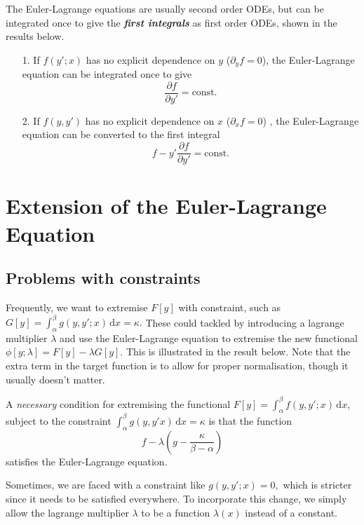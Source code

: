 \documentclass{article}
\theoremstyle{nonumberplain}
\begin{document}
The Euler-Lagrange equations are usually second order ODEs, but can be integrated once to give the \textit{\textbf{first integrals}} as first order ODEs, shown in the results below. 
\begin{frm-res} \label{res:first-integral}
    \quad 
    \begin{itemize}
        \item[1.] If $f(y' ; x)$ has no explicit dependence on $y$ ($\partial_y f =0$), the Euler-Lagrange equation can be integrated once to give 
        \[
            \frac{\partial f}{\partial y' } = \text{const}.
        \] 
        \item[2.] If $f(y,y' )$ has no explicit dependence on $x$ ($\partial_x f =0$) , the Euler-Lagrange equation can be converted to the first integral 
        \[
            f - y' \frac{\partial f}{\partial y' } = \text{const}.
        \]
    \end{itemize}
\end{frm-res}

\section{Extension of the Euler-Lagrange Equation}
\subsection{Problems with constraints}
Frequently, we want to extremise $F[y]$ with constraint, such as $G[y] = \int_{\alpha }^{\beta } g(y,y' ; x) \,\mathrm{d}x = \kappa . $ These could tackled by introducing a lagrange multiplier $\lambda $ and use the Euler-Lagrange equation to extremise the new functional $\phi[y; \lambda ] = F[y] - \lambda  G[y]$. This is illustrated in the result below. Note that the extra term in the target function is to allow for proper normalisation, though it usually doesn't matter. 
\begin{frm-res}
    A \textit{necessary} condition for extremising the functional $F[y] = \int_{\alpha }^{\beta } f(y,y' ; x) \,\mathrm{d}x $, subject to the constraint $\int_{\alpha }^{\beta } g(y,y'  x) \,\mathrm{d}x = \kappa $ is that the function 
    \[
        f - \lambda (g - \frac{\kappa }{\beta -\alpha })
    \]
    satisfies the Euler-Lagrange equation.
\end{frm-res}

Sometimes, we are faced with a constraint like $g(y,y'  ; x) = 0,$ which is stricter since it needs to be satisfied everywhere. To incorporate this change, we simply allow the lagrange multiplier $\lambda $ to be a function $\lambda (x)$ instead of a constant. 
\end{document}
